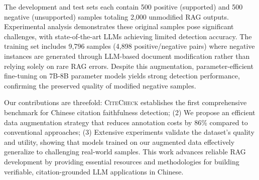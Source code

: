 The development and test sets each contain 500 positive (supported) and 500 negative (unsupported) samples totaling 2,000 unmodified RAG outputs. Experimental analysis demonstrates these original samples pose significant challenges, with state-of-the-art LLMs achieving limited detection accuracy. The training set includes 9,796 samples (4,898 positive/negative pairs) where negative instances are generated through LLM-based document modification rather than relying solely on rare RAG errors. Despite this augmentation, parameter-efficient fine-tuning on 7B-8B parameter models yields strong detection performance, confirming the preserved quality of modified negative samples.

Our contributions are threefold:  \textsc{CiteCheck} establishes the first comprehensive benchmark for Chinese citation faithfulness detection; (2) We propose an efficient data augmentation strategy that reduces annotation costs by 86\% compared to conventional approaches; (3) Extensive experiments validate the dataset’s quality and utility, showing that models trained on our augmented data effectively generalize to challenging real-world samples. This work advances reliable RAG development by providing essential resources and methodologies for building verifiable, citation-grounded LLM applications in Chinese.
